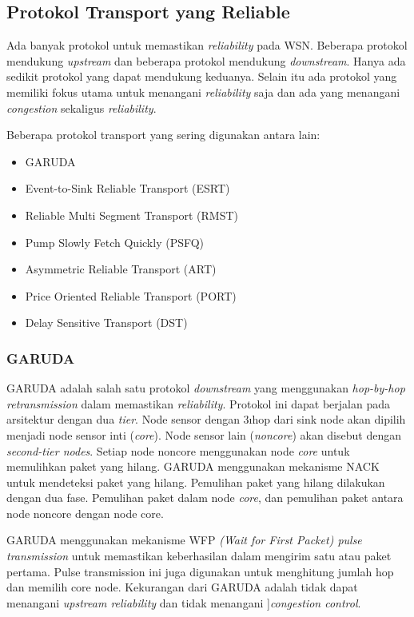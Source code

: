 \subsection{Protokol Transport yang Reliable}
Ada banyak protokol untuk memastikan \textit{reliability} pada WSN. Beberapa protokol mendukung \textit{upstream} dan beberapa protokol mendukung \textit{downstream}. Hanya ada sedikit protokol yang dapat mendukung keduanya. Selain itu ada protokol yang memiliki fokus utama untuk menangani \textit{reliability} saja dan ada yang menangani \textit{congestion} sekaligus \textit{reliability}. 

Beberapa protokol transport yang sering digunakan antara lain:
\begin{itemize}
	\item GARUDA
	\item Event-to-Sink Reliable Transport (ESRT)
	\item Reliable Multi Segment Transport (RMST)
	\item Pump Slowly Fetch Quickly (PSFQ)
	\item Asymmetric Reliable Transport (ART)
	\item Price Oriented Reliable Transport (PORT)
	\item Delay Sensitive Transport (DST)
\end{itemize}

\subsubsection{GARUDA}
GARUDA adalah salah satu protokol \textit{downstream} yang menggunakan \textit{hop-by-hop retransmission} dalam memastikan \textit{reliability}. Protokol ini dapat berjalan pada arsitektur dengan dua \textit{tier}. Node sensor dengan 3\i hop dari sink node akan dipilih menjadi node sensor inti (\textit{core}). Node sensor lain (\textit{noncore}) akan disebut dengan \textit{second-tier nodes}. Setiap node noncore menggunakan node \textit{core} untuk memulihkan paket yang hilang.  GARUDA menggunakan mekanisme NACK untuk mendeteksi paket yang hilang. Pemulihan paket yang hilang dilakukan dengan dua fase. Pemulihan paket dalam node \textit{core}, dan pemulihan paket antara node noncore dengan node core. 

GARUDA menggunakan mekanisme WFP \textit{(Wait for First Packet) pulse transmission} untuk memastikan keberhasilan dalam mengirim satu atau paket pertama. Pulse transmission ini juga digunakan untuk menghitung jumlah hop dan memilih core node. Kekurangan dari GARUDA adalah tidak dapat menangani \textit{upstream reliability} dan tidak menangani ]\textit{congestion control}.  


